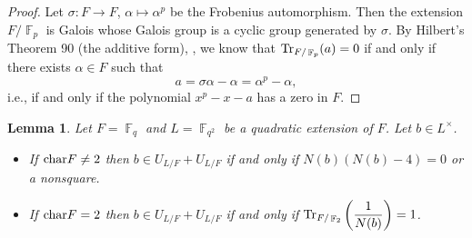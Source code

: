 \documentclass[11pt, a4paper]{amsart}
\newtheorem{lem}[thm]{Lemma}
\theoremstyle{definition}
\DeclareMathOperator{\F}{\mathbb{F}}
\numberwithin{equation}{section}
\begin{document}
\begin{proof}
    Let $\sigma\colon F\to F$, $\alpha\mapsto \alpha^p$ be the Frobenius automorphism. Then the extension $F/\F_p$ is Galois whose Galois group is a cyclic group generated by $\sigma$. By Hilbert's Theorem 90 (the additive form), \cite[Chapter VI, Theorem 6.3]{Lang2002}, we know that ${\rm Tr}_{F/\F_p}(a)=0$ if and only if there exists $\alpha\in F$ such that
    \[
    a=\sigma \alpha-\alpha =\alpha^p-\alpha,
    \]
   i.e., if and only if the polynomial $x^p-x-a$ has a zero in $F$.
\end{proof}

\begin{lem}
\label{lem:U+U}
    Let $F=\F_q$ and  $L=\F_{q^2}$ be a quadratic extension of $F$. Let $b\in L^\times$.
    \begin{itemize}
     \item[(a)] If  ${\rm char} F\not=2$ then $b\in U_{L/F}+U_{L/F}$ if and only if  $N(b)(N(b)-4)=0$ or a nonsquare.
        \item[(b)] If  ${\rm char} F=2$ then $b\in U_{L/F}+U_{L/F}$ if and only if  ${\rm Tr}_{F/\F_2}\left(\dfrac{1}{N(b)}\right)=1$.
           \end{itemize}
\end{lem}
\end{document}
